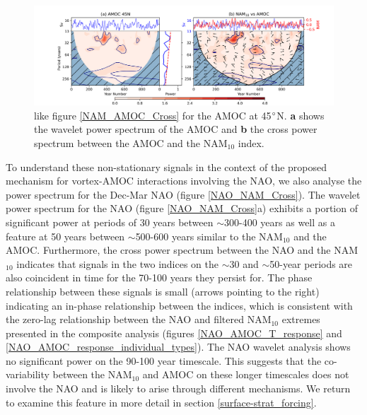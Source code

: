 \begin{center}
\begin{figure}[h!]
\noindent\includegraphics[width = \linewidth]{Figures/Figures-surface/AMOC_NAM_filtered_subplot_45N.png}
\caption[Wavelet power spectrum of the AMOC at 45$\degree$N and cross spectrum with the NAM$_{10}$ index]{like figure \ref{NAM_AMOC_Cross} for the AMOC at 45$\degree$N. \textbf{a} shows the wavelet power spectrum of the AMOC and \textbf{b} the cross power spectrum between the AMOC and the NAM$_{10}$ index.}
\label{NAM_AMOC_Cross_45}
\end{figure}
\end{center}
  
To understand these non-stationary signals in the context of the proposed mechanism for vortex-AMOC interactions involving the NAO, we also analyse the power spectrum for the Dec-Mar NAO (figure \ref{NAO_NAM_Cross}). The wavelet power spectrum for the NAO (figure \ref{NAO_NAM_Cross}a) exhibits a portion of significant power at periods of 30 years between $\sim$300-400 years as well as a feature at 50 years between $\sim$500-600 years similar to the NAM$_{10}$ and the AMOC. Furthermore, the cross power spectrum between the NAO and the NAM$_{10}$ indicates that signals in the two indices on the $\sim$30 and $\sim$50-year periods are also coincident in time for the 70-100 years they persist for. The phase relationship between these signals is small (arrows pointing to the right) indicating an in-phase relationship between the indices, which is consistent with the zero-lag relationship between the NAO and filtered NAM$_{10}$ extremes presented in the composite analysis (figures \ref{NAO_AMOC_T_response} and \ref{NAO_AMOC_response_individual_types}). The NAO wavelet analysis shows no significant power on the 90-100 year timescale. This suggests that the co-variability between the NAM$_{10}$ and AMOC on these longer timescales does not involve the NAO and is likely to arise through different mechanisms. We return to examine this feature in more detail in section \ref{surface-strat_forcing}.

